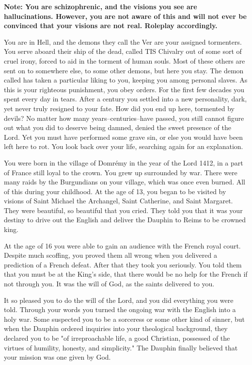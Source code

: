 \documentclass[char]{guildcamp4}
\begin{document}
\name{\cJoan{}}


{\bf Note: You are schizophrenic, and the visions you see are hallucinations. However, you are not aware of this and will not ever be convinced that your visions are not real. Roleplay accordingly.}

You are in Hell, and the demons they call the Ver are your assigned tormenters. You serve aboard their ship of the dead, called TIS Chivalry out of some sort of cruel irony, forced to aid in the torment of human souls. Most of these others are sent on to somewhere else, to some other demons, but here you stay. The demon called \cVone{} has taken a particular liking to you, keeping you among \cVone{\their} personal slaves. As this is your righteous punishment, you obey \cVone{\their} orders. For the first few decades you spent every day in tears. After a century you settled into a new personality, dark, yet never truly resigned to your fate. How did you end up here, tormented by devils? No matter how many years--centuries--have passed, you still cannot figure out what you did to deserve being damned, denied the sweet presence of the Lord. Yet you must have performed some grave sin, or else you would have been left here to rot. You look back over your life, searching again for an explanation.

You were born in the village of Domr\'{e}my in the year of the Lord 1412, in a part of France still loyal to the crown. You grew up surrounded by war. There were many raids by the Burgundians on your village, which was once even burned. All of this during your childhood. At the age of 13, you began to be visited by visions of Saint Michael the Archangel, Saint Catherine, and Saint Margaret. They were beautiful, so beautiful that you cried. They told you that it was your destiny to drive out the English and deliver the Dauphin to Reims to be crowned king. 

At the age of 16 you were able to gain an audience with the French royal court. Despite much scoffing, you proved them all wrong when you delivered a prediction of a French defeat. After that they took you seriously. You told them that you must be at the King's side, that there would be no help for the French if not through you. It was the will of God, as the saints delivered to you.

It so pleased you to do the will of the Lord, and you did everything you were told. Through your words you turned the ongoing war with the English into a holy war. Some suspected you to be a sorceress or some other kind of sinner, but when the Dauphin ordered inquiries into your theological background, they declared you to be "of irreproachable life, a good Christian, possessed of the virtues of humility, honesty, and simplicity." The Dauphin finally believed that your mission was one given by God.
\end{document}
